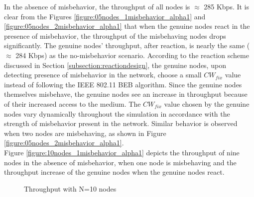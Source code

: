 \documentclass[12pt,letterpaper,english]{article}
\begin{document}
\indent In the absence of misbehavior, the throughput of all nodes is $\approx$ 285 Kbps. It is clear from the Figures \ref{figure:05nodes_1misbehavior_alpha1} and \ref{figure:05nodes_2misbehavior_alpha1} that when the genuine nodes react in the presence of misbehavior, the throughput of the misbehaving nodes drops significantly. 
The genuine nodes' throughput, after reaction, is nearly the same ($\approx$ 284 Kbps) as the no-misbehavior scenario. 
According to the reaction scheme discussed in Section \ref{subsection:reactiondesign}, the genuine nodes, upon detecting presence of misbehavior in the network, choose a small $CW_{fix}$ value instead of following the IEEE 802.11 BEB algorithm.  Since the genuine nodes themselves misbehave, the genuine nodes see an increase in throughput because of their increased access to the medium. The $CW_{fix}$ value chosen by the genuine nodes vary dynamically throughout the simulation in accordance with the strength of misbehavior present in the network.
Similar behavior is observed when two nodes are misbehaving, as shown in Figure \ref{figure:05nodes_2misbehavior_alpha1}.
\\
\indent Figure \ref{figure:10nodes_1misbehavior_alpha1} depicts the throughput of nine nodes in the absence of misbehavior, when one node is misbehaving and the throughput increase of the genuine nodes when the genuine nodes react. 
\begin{figure}[H]
\centering
{}
\caption{Throughput with N=10 nodes}
\label{figure:10nodes}
\end{figure}
\end{document}
